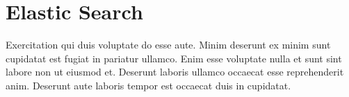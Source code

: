 
\chapter{Elastic Search} \label{ch:elasticSearch}

Exercitation qui duis voluptate do esse aute. Minim deserunt ex minim sunt cupidatat est fugiat in pariatur ullamco. Enim esse voluptate nulla et sunt sint labore non ut eiusmod et. Deserunt laboris ullamco occaecat esse reprehenderit anim. Deserunt aute laboris tempor est occaecat duis in cupidatat.
